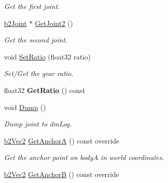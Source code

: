 \begin{DoxyCompactItemize}
\begin{DoxyCompactList}\small\item\em Get the first joint. \end{DoxyCompactList}\item 
\mbox{\label{classb2GearJoint_af1673b8edd80f3ae3b868c3a18b7b058}} 
\hyperlink{classb2Joint}{b2\+Joint} $\ast$ \hyperlink{classb2GearJoint_af1673b8edd80f3ae3b868c3a18b7b058}{Get\+Joint2} ()
\begin{DoxyCompactList}\small\item\em Get the second joint. \end{DoxyCompactList}\item 
\mbox{\label{classb2GearJoint_a21c867bdc00c15ade2f399d370f92636}} 
void \hyperlink{classb2GearJoint_a21c867bdc00c15ade2f399d370f92636}{Set\+Ratio} (float32 ratio)
\begin{DoxyCompactList}\small\item\em Set/\+Get the gear ratio. \end{DoxyCompactList}\item 
\mbox{\label{classb2GearJoint_a46dffdce62bdf15a28c10a27d640bc10}} 
float32 {\bfseries Get\+Ratio} () const
\item 
\mbox{\label{classb2GearJoint_a1620b5a39e9da2b40d324c45736ad322}} 
void \hyperlink{classb2GearJoint_a1620b5a39e9da2b40d324c45736ad322}{Dump} ()
\begin{DoxyCompactList}\small\item\em Dump joint to dm\+Log. \end{DoxyCompactList}\item 
\mbox{\label{classb2GearJoint_a2928d2e9eac9137808537faa9b30a649}} 
\hyperlink{structb2Vec2}{b2\+Vec2} \hyperlink{classb2GearJoint_a2928d2e9eac9137808537faa9b30a649}{Get\+AnchorA} () const override
\begin{DoxyCompactList}\small\item\em Get the anchor point on bodyA in world coordinates. \end{DoxyCompactList}\item 
\mbox{\label{classb2GearJoint_a3d24a3265e64f36017404a36abcb7889}} 
\hyperlink{structb2Vec2}{b2\+Vec2} \hyperlink{classb2GearJoint_a3d24a3265e64f36017404a36abcb7889}{Get\+AnchorB} () const override

\end{DoxyCompactItemize}

